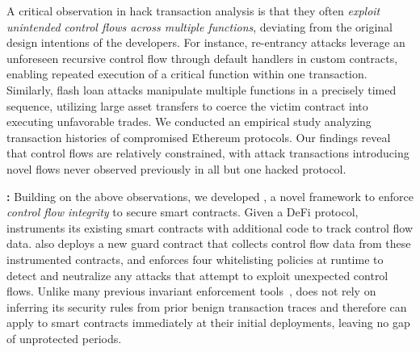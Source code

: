 A critical observation in hack transaction analysis is that they often
\emph{exploit unintended control flows across multiple functions}, deviating
from the original design intentions of the developers. For instance,
re-entrancy attacks leverage an unforeseen recursive control flow through
default handlers in custom contracts, enabling repeated execution of a critical
function within one transaction. Similarly, flash loan attacks manipulate
multiple functions in a precisely timed sequence, utilizing large asset
transfers to coerce the victim contract into executing unfavorable trades.
We conducted an empirical study analyzing transaction histories of 
 compromised Ethereum protocols. 
Our findings reveal that control flows are relatively constrained, 
with attack transactions introducing novel flows never observed 
previously in all but one hacked protocol.




\noindent \textbf{{\name}:} 
Building on the above observations, we developed {\name}, a novel framework to
enforce \emph{control flow integrity} to secure smart contracts. Given a DeFi
protocol, {\name} instruments its existing smart contracts with additional code
to track control flow data. {\name} also deploys a new guard contract that
collects control flow data from these instrumented contracts, and enforces four
whitelisting policies at runtime to detect and neutralize any attacks that
attempt to exploit unexpected control flows. Unlike many previous invariant
enforcement tools~\cite{chen2024demystifying, liu2022invcon}, {\name} does not
rely on inferring its security rules from prior benign transaction traces and
therefore can apply to smart contracts immediately at their initial
deployments, leaving no gap of unprotected periods.

